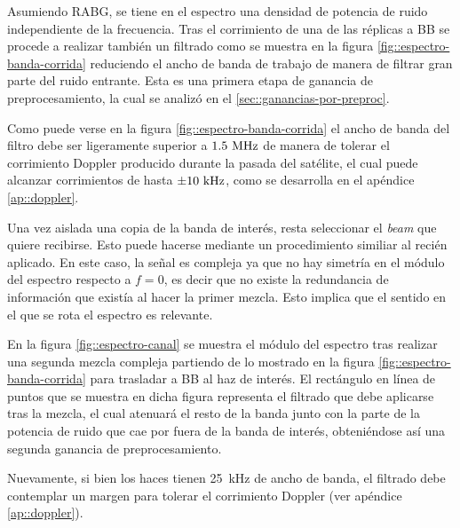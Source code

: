 \documentclass[../../main.tex]{subfiles}
\begin{document}
Asumiendo RABG, se tiene en el espectro una densidad de potencia de ruido independiente de la frecuencia. 
Tras el corrimiento de una de las réplicas a BB se procede a realizar también un filtrado como se muestra en la figura \ref{fig::espectro-banda-corrida} reduciendo el ancho de banda de trabajo de manera de filtrar gran parte del ruido entrante. Esta es una primera etapa de ganancia de preprocesamiento, la cual se analizó en el \cref{sec::ganancias-por-preproc}. 

Como puede verse en la figura \ref{fig::espectro-banda-corrida} el ancho de banda del filtro debe ser ligeramente superior a $1.5~\textrm{MHz}$ de manera de tolerar el corrimiento Doppler producido durante la pasada del satélite, el cual puede alcanzar corrimientos de hasta $\pm 10~\textrm{kHz}$, como se desarrolla en el apéndice \ref{ap::doppler}.

Una vez aislada una copia de la banda de interés, resta seleccionar el \textit{beam} que quiere recibirse. Esto puede hacerse mediante un procedimiento similiar al recién aplicado. En este caso, la señal es compleja ya que no hay simetría en el módulo del espectro respecto a $f = 0$, es decir que no existe la redundancia de información que existía al hacer la primer mezcla. Esto implica que el sentido en el que se rota el espectro es relevante.

En la figura \ref{fig::espectro-canal} se muestra el módulo del espectro tras realizar una segunda mezcla compleja partiendo de lo mostrado en la figura \ref{fig::espectro-banda-corrida} para trasladar a BB al haz de interés. El rectángulo en línea de puntos que se muestra en dicha figura representa el filtrado que debe aplicarse tras la mezcla, el cual atenuará el resto de la banda junto con la parte de la potencia de ruido que cae por fuera de la banda de interés, obteniéndose así una segunda ganancia de preprocesamiento.

Nuevamente, si bien los haces tienen 25~kHz de ancho de banda, el filtrado debe contemplar un margen para tolerar el corrimiento Doppler (ver apéndice \ref{ap::doppler}).


\end{document}
